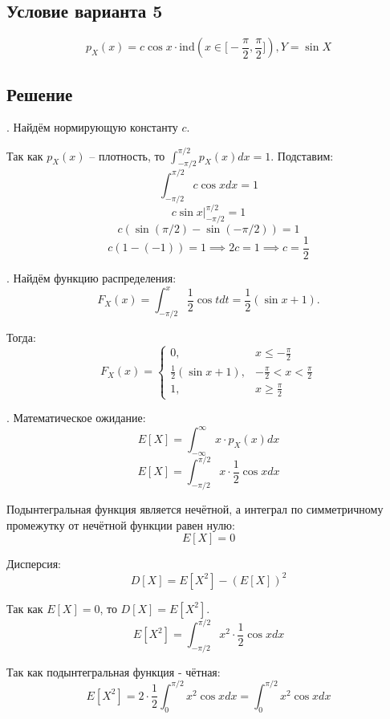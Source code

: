 \documentclass[a4paper,14pt]{extarticle}
\begin{document}
        \subsection*{Условие варианта 5}
            \[p_X(x) = c \cos x \cdot \mathrm{ind}(x \in \big[-\frac{\pi}{2}, \frac{\pi}{2}\big]), Y = \sin X\]
        
        \subsection*{Решение}
            . Найдём нормирующую константу $c$.
            
            Так как $p_X(x)$ -- плотность, то $\int_{-\pi/2}^{\pi/2} p_X(x) dx = 1$. Подставим:
            \[\int_{-\pi/2}^{\pi/2} c \cos x dx = 1\]
            \[c \sin x |^{\pi/2}_{-\pi/2} = 1\]
            \[c(\sin(\pi/2) - \sin(-\pi/2)) = 1\]
            \[c(1 - (-1)) = 1 \implies 2c = 1 \implies \boxed{c = \frac{1}{2}}\]
            
            . Найдём функцию распределения:
            \[F_X(x) = \int_{-\pi/2}^{x}\frac{1}{2}\cos t dt = \frac{1}{2} (\sin x + 1). \]
            
            Тогда:
            \[ \boxed{F_X (x)= \begin{cases}
                                   0, & x \leq -\frac{\pi}{2} \\
                                   \frac{1}{2} (\sin x + 1), & -\frac{\pi}{2} < x < \frac{\pi}{2} \\
                                   1, & x \geq \frac{\pi}{2}
            \end{cases}}\]
            
            . Математическое ожидание:
            \[E[X] = \int_{-\infty}^{\infty} x \cdot p_X(x) dx\]
            \[E[X] = \int_{-\pi/2}^{\pi/2} x \cdot \frac{1}{2} \cos x dx\]
            
            Подынтегральная функция является нечётной, а интеграл по симметричному промежутку от нечётной функции равен нулю:
            \[\boxed{E[X] = 0}\]
            
            Дисперсия:
            \[D[X] = E[X^2] - (E[X])^2\]
            
            Так как $E[X] = 0$, то $D[X] = E[X^2]$.
            \[E[X^2] = \int_{-\pi/2}^{\pi/2} x^2 \cdot \frac{1}{2} \cos x dx\]
            
            Так как подынтегральная функция - чётная: \[E[X^2] = 2 \cdot \frac{1}{2} \int_{0}^{\pi/2} x^2 \cos x dx = \int_{0}^{\pi/2} x^2 \cos x dx\]
            
\end{document}
